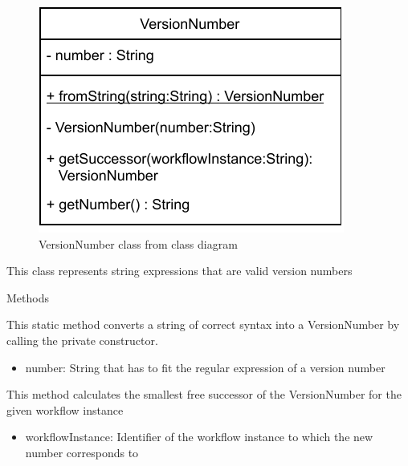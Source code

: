 
\begin{figure}[h]
\centerline{\includegraphics[scale=1]{res/Klassen/VersionNumber.pdf}}
\caption{VersionNumber class from class diagram}
\end{figure}

This class represents string expressions that are valid version numbers
\begin{methodenv}{Methods}

This static method converts a string of correct syntax into a VersionNumber by calling the private constructor.

\begin{itemize}
	\item{number:}
	String that has to fit the regular expression of a version number
\end{itemize}

This method calculates the smallest free successor of the VersionNumber for the given workflow instance

\begin{itemize}
	\item{workflowInstance:}
	Identifier of the workflow instance to which the new number corresponds to
\end{itemize}
\end{methodenv}


